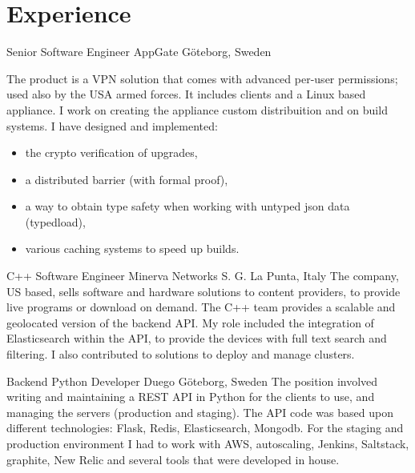 \documentclass[11pt,a4paper,sans]{moderncv} %
\begin{document}
\section{Experience}

    {Senior Software Engineer}
    {AppGate}
    {G\"{o}teborg, Sweden}
    {}
    {
        The product is a VPN solution that comes with advanced per-user
        permissions; used also by the USA armed forces. It includes clients and a Linux based appliance.
        \newline
        I work on creating the appliance custom distribuition and on build systems.
        \newline
        I have designed and implemented:
        \begin{itemize}
        \item the crypto verification of upgrades,
        \item a distributed barrier (with formal proof),
        \item a way to obtain type safety when working with untyped json data (typedload),
        \item various caching systems to speed up builds.
        \end{itemize}
    }

    {C++ Software Engineer}
    {Minerva Networks}
    {S. G. La Punta, Italy}
    {}
    {
        The company, US based, sells software and hardware solutions to content providers, to provide live programs or download on demand.
        \newline
        The C++ team provides a scalable and geolocated version of the backend API.
        \newline
        My role included the integration of Elasticsearch within the API, to provide the devices with full text search and filtering.
        I also contributed to solutions to deploy and manage clusters.
    }

    {Backend Python Developer}
    {Duego}
    {G\"{o}teborg, Sweden}
    {}
    {
        The position involved writing and maintaining a REST API in Python for the clients to use, and managing the servers (production and staging).
        \newline
        The API code was based upon different technologies: Flask, Redis, Elasticsearch, Mongodb.
        For the staging and production environment I had to work with AWS, autoscaling, Jenkins, Saltstack, graphite, New Relic and several tools that were developed in house.
    }
\end{document}
